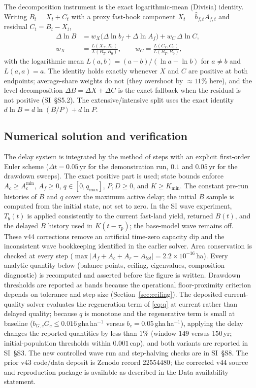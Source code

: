 \documentclass[preprint,12pt,authoryear]{elsarticle}
\newcommand{\Acmin}{A_c^{\min}}
\begin{document}
The decomposition instrument is the exact logarithmic-mean (Divisia) identity. Writing $B_t=X_t+C_t$ with a proxy fast-book component $X_t=\hat b_{f,t}A_{f,t}$ and residual $C_t=B_t-X_t$,
\begin{equation}\label{eq:divisia}
\begin{split}
\Delta\ln B&=w_X\big(\Delta\ln b_f+\Delta\ln A_f\big)+w_C\,\Delta\ln C,\\
w_X&=\frac{L(X_T,X_0)}{L(B_T,B_0)},\qquad w_C=\frac{L(C_T,C_0)}{L(B_T,B_0)},
\end{split}
\end{equation}
with the logarithmic mean $L(a,b)=(a-b)/(\ln a-\ln b)$ for $a\neq b$ and $L(a,a)=a$. The identity holds exactly whenever $X$ and $C$ are positive at both endpoints; average-share weights do not (they overshoot by $\approx11\%$ here), and the level decomposition $\Delta B=\Delta X+\Delta C$ is the exact fallback when the residual is not positive (SI~\S S5.2). The extensive/intensive split uses the exact identity $d\ln B=d\ln(B/P)+d\ln P$.

\subsection{Numerical solution and verification}\label{sec:numerics}

The delay system is integrated by the method of steps with an explicit first-order Euler scheme ($\Delta t=0.05$\,yr for the demonstration run, $0.1$ and $0.05$\,yr for the drawdown sweeps). The exact positive part is used; state bounds enforce $A_c\ge\Acmin$, $A_f\ge0$, $q\in[0,q_{\max}]$, $P,D\ge0$, and $K\ge K_{\min}$. The constant pre-run histories of $B$ and $q$ cover the maximum active delay; the initial $B$ sample is computed from the initial state, not set to zero. In the SI wave experiment, $T_b(t)$ is applied consistently to the current fast-land yield, returned $B(t)$, and the delayed $B$ history used in $K(t-\tau_p)$; the base-model wave remains off. These v44 corrections remove an artificial time-zero capacity dip and the inconsistent wave bookkeeping identified in the earlier solver. Area conservation is checked at every step ($\max|A_f+A_c+A_r-A_{tot}|=2.2\times10^{-16}$\,ha). Every analytic quantity below (balance points, ceiling, eigenvalues, composition diagnostic) is recomputed and asserted before the figure is written. Drawdown thresholds are reported as bands because the operational floor-proximity criterion depends on tolerance and step size (Section~\ref{sec:ceiling}). The deposited current-quality solver evaluates the regeneration term of \eqref{eq:q} at current rather than delayed quality; because $q$ is monotone and the regenerative term is small at baseline ($b_{G,c}G_c\le0.016$\,gha\,ha$^{-1}$ versus $b_c=0.05$\,gha\,ha$^{-1}$), applying the delay changes the reported quantities by less than $1\%$ (window $149$ versus $150$\,yr; initial-population thresholds within $0.001$\,cap), and both variants are reported in SI~\S S3. The new controlled wave run and step-halving checks are in SI~\S S8. The prior v43 code/data deposit is Zenodo record 22554480; the corrected v44 source and reproduction package is available as described in the Data availability statement.
\end{document}
